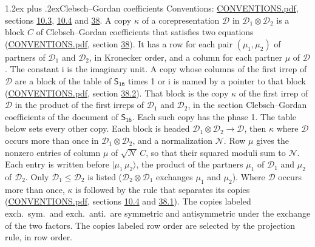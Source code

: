 \documentclass[10pt,a4paper]{article}
\makeatletter
\renewcommand\section{\@startsection{section}{1}{\z@}{-3ex plus -1ex minus -.2ex}%
  {1.2ex plus .2ex}{\normalfont\large\sffamily\bfseries\color{parttitle}}}
\numberwithin{equation}{section}
\newcommand{\grp}[1]{\mathsf{#1}}
\newcommand{\iunit}{\mathrm{i}}
\newcommand{\irrprod}{\otimes}
\newcommand{\mult}{\kappa}
\newcommand{\intx}{\mu}
\newcommand{\cgnorm}{\mathcal{N}}
\newcommand{\prodket}[2]{\lvert {#1}\,{#2}\rangle}
\makeatother
\begin{document}
\section{Clebsch--Gordan coefficients}\label{s:clebsch_gordan}
Conventions: \href{../../CONVENTIONS.pdf}{CONVENTIONS.pdf}, sections \href{../../../rotation/CONVENTIONS.pdf\#conv.10.3}{10.3}, \href{../../../rotation/CONVENTIONS.pdf\#conv.10.4}{10.4} and \href{../../CONVENTIONS.pdf\#conv.38}{38}.
\leavevmode\label{n:index.copy}\label{n:matrix.cg.stored}A copy $\mult$ of a corepresentation $\mathcal{D}$ in $\mathcal{D}_1\irrprod\mathcal{D}_2$ is a block $C$ of Clebsch--Gordan coefficients that satisfies two equations (\href{../../CONVENTIONS.pdf}{CONVENTIONS.pdf}, section \href{../../CONVENTIONS.pdf\#conv.38}{38}). \label{n:index.cg}It has a row for each pair $(\intx_1, \intx_2)$ of partners of $\mathcal{D}_1$ and $\mathcal{D}_2$, in Kronecker order, and a column for each partner $\intx$ of $\mathcal{D}$.
The constant $\iunit$ is the imaginary unit.
A copy whose columns of the first irrep of $\mathcal{D}$ are a block of the table of $\grp{S_{16}}$ times 1 or $\iunit$ is named by a pointer to that block (\href{../../CONVENTIONS.pdf}{CONVENTIONS.pdf}, section \href{../../CONVENTIONS.pdf\#conv.38.2}{38.2}). That block is the copy $\mult$ of the first irrep of $\mathcal{D}$ in the product of the first irreps of $\mathcal{D}_1$ and $\mathcal{D}_2$, in the section Clebsch--Gordan coefficients of the document of \href{../../../rotation/data/pdf/S16.pdf}{$\grp{S_{16}}$}. Each such copy has the phase 1. The table below sets every other copy.
Each block is headed $\mathcal{D}_1\irrprod\mathcal{D}_2\to\mathcal{D}$, then $\mult$ where $\mathcal{D}$ occurs more than once in $\mathcal{D}_1\irrprod\mathcal{D}_2$, and a normalization $\cgnorm$. Row $\intx$ gives the nonzero entries of column $\intx$ of $\sqrt{\cgnorm}\,C$, so that their squared moduli sum to $\cgnorm$. \label{n:vector.ket.product}Each entry is written before $\prodket{\intx_1}{\intx_2}$, the product of the partners $\intx_1$ of $\mathcal{D}_1$ and $\intx_2$ of $\mathcal{D}_2$. Only $\mathcal{D}_1 \le \mathcal{D}_2$ is listed ($\mathcal{D}_2\irrprod\mathcal{D}_1$ exchanges $\intx_1$ and $\intx_2$).
Where $\mathcal{D}$ occurs more than once, $\mult$ is followed by the rule that separates its copies (\href{../../CONVENTIONS.pdf}{CONVENTIONS.pdf}, sections \href{../../../rotation/CONVENTIONS.pdf\#conv.10.4}{10.4} and \href{../../CONVENTIONS.pdf\#conv.38.1}{38.1}). \label{n:abbreviation.exchange}The copies labeled exch.\ sym.\ and exch.\ anti.\ are symmetric and antisymmetric under the exchange of the two factors. The copies labeled row order are selected by the projection rule, in row order.
\end{document}
